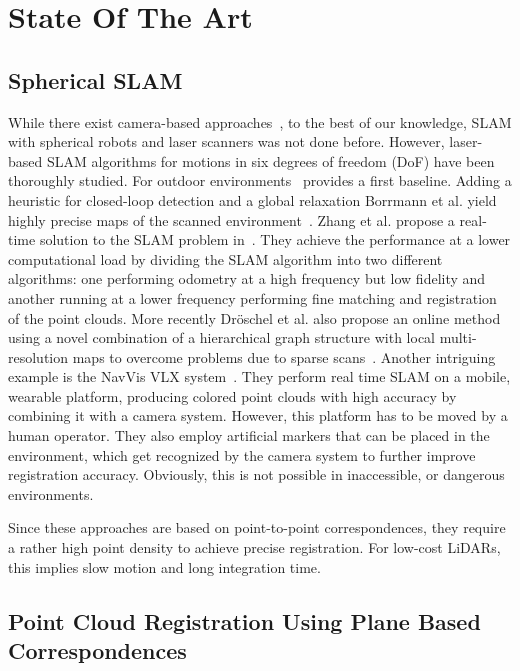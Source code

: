 \section{State Of The Art}

\subsection{Spherical SLAM}

While there exist camera-based approaches~\cite{9233654}, to the best of our knowledge, SLAM with spherical robots and laser scanners was not done before.
However, laser-based SLAM algorithms for motions in six degrees of freedom (DoF) have been thoroughly studied.
For outdoor environments~\cite{JFR2006} provides a first baseline.
Adding a heuristic for closed-loop detection and a global relaxation Borrmann et al. yield highly precise maps of the scanned environment~\cite{RAS2007}.
Zhang et al. propose a real-time solution to the SLAM problem in~\cite{Zhang2014}.
They achieve the performance at a lower computational load by dividing the SLAM algorithm into two different algorithms: one performing odometry at a high frequency but low fidelity and another running at a lower frequency performing fine matching and registration of the point clouds.
More recently Dröschel et al. also propose an online method using a novel combination of a hierarchical graph structure with local multi-resolution maps to overcome problems due to sparse scans~\cite{Droeschel2018}.
Another intriguing example is the NavVis VLX system~\cite{navvis}.
They perform real time SLAM on a mobile, wearable platform, producing colored point clouds with high accuracy by combining it with a camera system.
However, this platform has to be moved by a human operator. 
They also employ artificial markers that can be placed in the environment, which get recognized by the camera system to further improve registration accuracy.
Obviously, this is not possible in inaccessible, or dangerous environments.

Since these approaches are based on point-to-point correspondences, they require a rather high point density to achieve precise registration.
For low-cost LiDARs, this implies slow motion and long integration time.

\subsection{Point Cloud Registration Using Plane Based Correspondences}

